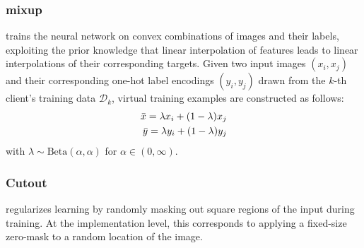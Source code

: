 \subsubsection{mixup} \cite{zhang2017mixup} trains the neural network on convex combinations of images and their labels, exploiting the prior knowledge that linear interpolation of features leads to linear interpolations of their corresponding targets. Given two input images $(x_i,x_j)$ and their corresponding one-hot label encodings $(y_i,y_j)$ drawn from the $k$-th client's training data $\mathcal{D}_k$, virtual training examples are constructed as follows:
\begin{equation}
\begin{split}
    \Bar{x} = \lambda x_i + (1-\lambda) x_j\\
    \Bar{y} = \lambda y_i + (1-\lambda) y_j
\end{split}
\end{equation}
with $\lambda\sim \text{Beta}(\alpha,\alpha)$ for $\alpha\in(0,\infty)$. 
\subsubsection{Cutout} \cite{devries2017improved} regularizes learning by randomly masking out square regions of the input during training. At the implementation level, this corresponds to applying a fixed-size zero-mask to a random location of the image. 

